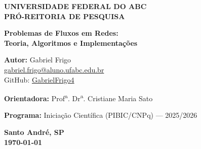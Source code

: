 \documentclass[12pt,a4paper]{article}
\begin{document}
\setlength{\emergencystretch}{3em}
\onehalfspacing

\begin{titlepage}
    \begin{center}
        \textbf{\large UNIVERSIDADE FEDERAL DO ABC}\\[0.2cm]
        \textbf{\large PRÓ-REITORIA DE PESQUISA}
        
        \vspace{4cm}
        
        {\LARGE \bfseries Problemas de Fluxos em Redes:\\ Teoria, Algoritmos e Implementações}
        
        \vspace{3cm}
        
        {\large \textbf{Autor:} Gabriel Frigo} \\[0.15cm]
        {\normalsize \href{mailto:gabriel.frigo@aluno.ufabc.edu.br}{gabriel.frigo@aluno.ufabc.edu.br}} \\[0.1cm]
        {\normalsize GitHub: \href{https://github.com/GabrielFrigo4}{GabrielFrigo4}}
        
        \vspace{1.5cm}
        
        {\large \textbf{Orientadora:} Prof\textsuperscript{a}. Dr\textsuperscript{a}. Cristiane Maria Sato}
        
        \vspace{2cm}
        
        {\normalsize \textbf{Programa:} Iniciação Científica (PIBIC/CNPq) --- 2025/2026}
        
        \vfill
        
        \textbf{Santo André, SP}\\[0.2cm]
        \textbf{\today}
    \end{center}
\end{titlepage}

\newpage
\end{document}
